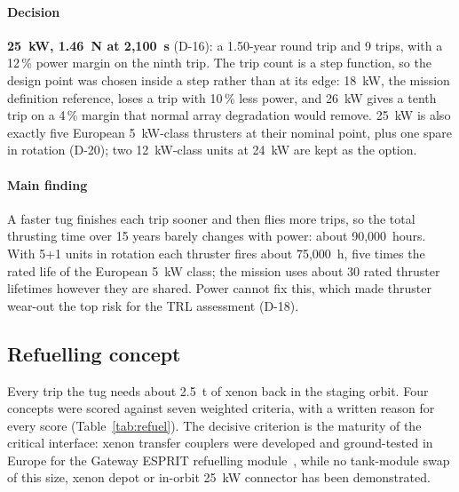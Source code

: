 \documentclass[11pt,a4paper]{article}
\newcommand{\id}[1]{#1}
\begin{document}
\paragraph{Decision} \textbf{25~kW, 1.46~N at 2,100~s} (\id{D-16}): a 1.50-year round trip and 9 trips, with a 12\,\% power margin on the ninth trip. The trip count is a step function, so the design point was chosen inside a step rather than at its edge: 18~kW, the mission definition reference, loses a trip with 10\,\% less power, and 26~kW gives a tenth trip on a 4\,\% margin that normal array degradation would remove. 25~kW is also exactly five European 5~kW-class thrusters at their nominal point, plus one spare in rotation (\id{D-20}); two 12~kW-class units at 24~kW are kept as the option.

\paragraph{Main finding} A faster tug finishes each trip sooner and then flies more trips, so the total thrusting time over 15 years barely changes with power: about 90,000~hours. With 5+1 units in rotation each thruster fires about 75,000~h, five times the rated life of the European 5~kW class; the mission uses about 30 rated thruster lifetimes however they are shared. Power cannot fix this, which made thruster wear-out the top risk for the TRL assessment (\id{D-18}).

\subsection{Refuelling concept}

Every trip the tug needs about 2.5~t of xenon back in the staging orbit. Four concepts were scored against seven weighted criteria, with a written reason for every score (Table~\ref{tab:refuel}). The decisive criterion is the maturity of the critical interface: xenon transfer couplers were developed and ground-tested in Europe for the Gateway ESPRIT refuelling module~\cite{ohbesprit,radke}, while no tank-module swap of this size, xenon depot or in-orbit 25~kW connector has been demonstrated.
\end{document}
